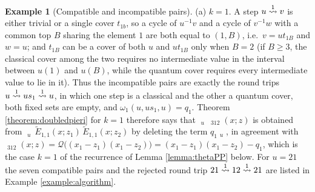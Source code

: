 \documentclass{amsart}
\theoremstyle{definition}
\newtheorem{example}[lemma]{Example}
\theoremstyle{remark}
\numberwithin{equation}{section}
\DeclareMathOperator{\qsch}{\widetilde{\mathfrak{S}}}
\newcommand{\xrightsquigarrow}[2][]{%
	\mathrel{\mathop{\rightsquigarrow}\limits^{\scriptstyle #2}%
	\ifx\hfuzz#1\hfuzz\else_{\scriptstyle #1}\fi}%
}
\newcommand{\tom}[1]{\ensuremath{\xrightsquigarrow{#1}}}
\newcommand{\qelem}{\widetilde{E}}
\begin{document}
\begin{example}[Compatible and incompatible pairs] \label{example:doubled}
(a) $k=1$. A step $u\tom1v$ is either trivial or a single cover $t_{1b}$, so a cycle of $u^{-1}v$ and a cycle of $v^{-1}w$ with a common top $B$ sharing the element $1$ are both equal to $(1,B)$, i.e.\ $v=ut_{1B}$ and $w=u$; and $t_{1B}$ can be a cover of both $u$ and $ut_{1B}$ only when $B=2$ (if $B\geq3$, the classical cover among the two requires no intermediate value in the interval between $u(1)$ and $u(B)$, while the quantum cover requires every intermediate value to lie in it). Thus the incompatible pairs are exactly the round trips $u\tom1us_1\tom1u$, in which one step is a classical and the other a quantum cover, both fixed sets are empty, and $\omega_1(u,us_1,u)=q_1$. Theorem \ref{theorem:doubledpieri} for $k=1$ therefore says that $\qsch_u\,\qsch_{312}(x;z)$ is obtained from $\qsch_u\,\qelem_{1,1}(x;z_1)\,\qelem_{1,1}(x;z_2)$ by deleting the term $q_1\qsch_u$, in agreement with $\qsch_{312}(x;z)=\mathcal Q\big((x_1-z_1)(x_1-z_2)\big)=(x_1-z_1)(x_1-z_2)-q_1$, which is the case $k=1$ of the recurrence of Lemma \ref{lemma:thetaPP} below. For $u=21$ the seven compatible pairs and the rejected round trip $21\tom112\tom121$ are listed in Example \ref{example:algorithm}.


\end{example}
\end{document}
